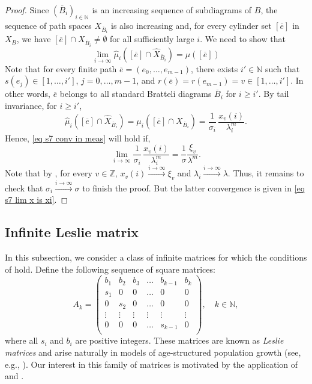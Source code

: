 \documentclass[11pt,reqno]{amsart}
\theoremstyle{definition}
\theoremstyle{remark}
\theoremstyle{plain}
\def\ol{\overline}
\def\wh{\widehat}
\newcommand{\N}{\mathbb N}
\newcommand{\Z}{\mathbb Z}
\newcommand{\be}{\begin{equation}}
\newcommand{\ee}{\end{equation}}
\numberwithin{equation}{section}
\begin{document}
\begin{proof}
Since $(\ol B_i)_{i \in \N}$ is an increasing sequence of subdiagrams of $B$, the sequence of path spaces $X_{\ol B_i}$ is also increasing and, for every cylinder set $[\ol e]$ in $X_B$, we have
$[\ol e] \cap X_{\ol B_i} \neq\emptyset$ for all sufficiently large $i$. We need to show that 
\be\label{eq s7 conv in meas}
\lim_{i\to\infty}\wh \mu_i ([\ol e] \cap \wh X_{\ol B_i}) = \mu ([\ol e])
\ee
Note that for every finite path $\ol e = (e_0, \ldots, e_{m-1})$, there exists $i' \in \N$ such that $s(e_j) \in [1, \ldots, i']$, $j = 0, \dots, m-1$, and $r(\ol e) = r(e_{m-1}) = v \in [1, \ldots, i']$. In other words, $\ol e$ belongs to all standard Bratteli diagrams $\ol B_i$ for $i \geq i'$. By tail invariance, for $i \geq i'$, 
$$
\wh \mu_i([\ol e] \cap \wh X_{\ol B_i}) = \mu_i([\ol e] \cap X_{\ol B_i})= 
\frac{1}{\sigma_i}\,\frac{x_{v}(i)}{\lambda_i^m}.
$$ 
Hence, \eqref{eq s7 conv in meas} will hold if,
$$
\lim_{i \to \infty} \frac{1}{\sigma_i} \,\frac{x_{v} (i)}{\lambda_i^m} = \frac{1}{\sigma} \frac{\xi_v}{\lambda^m}. 
$$
Note that by , for every $v \in \Z$, 
 $x_{v}(i) \xrightarrow{i \rightarrow \infty} \xi_v$ and $\lambda_i \xrightarrow{i \rightarrow \infty} \lambda$. 
Thus, it remains to check that $\sigma_i \xrightarrow{i \rightarrow \infty} \sigma$ to finish the proof. But the latter convergence is given in \eqref{eq s7 lim x is xi}.

\end{proof}
\subsection{Infinite Leslie matrix} 
In this subsection, we consider a class of infinite matrices for which the conditions of  hold. Define the following sequence of square matrices:
$$
A_k = \begin{pmatrix}\label{eq: Leslie_finite}
b_1 & b_2 & b_3 &  \ldots &b_{k-1} & b_k \\
s_1 & 0& 0 &   \ldots & 0 & 0 \\
0 &  s_2 & 0 &   \ldots & 0 & 0 \\
\vdots & \vdots & \vdots & \vdots & \vdots & \vdots \\
0 & 0& 0& \ldots & s_{k-1} & 0 \\ 
\end{pmatrix}, \quad  k \in \N,
$$
where all $s_i$ and $b_i$ are positive integers.
These matrices are known as \textit{Leslie matrices} and arise naturally in models of age-structured population growth
(see, e.g., \cite{Leslie1948}).
Our interest in this family of matrices is motivated by the application of  and . 
\end{document}
